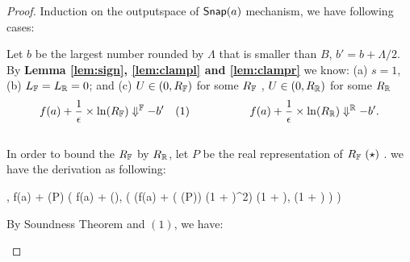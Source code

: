 \documentclass[a4paper,11pt]{article}
\begin{document}
\begin{proof}
%
Induction on the outputspace of $\mathsf{Snap}(a)$ mechanism, we have following cases:
	\begin{itemize}
		Let $b$ be the largest number rounded by $\Lambda$ that is smaller than $B$, $b' = b + \Lambda / 2$.
		\\
		By \textbf{Lemma \ref{lem:sign}, \ref{lem:clampl} and \ref{lem:clampr}} we know:
		(a) $s = 1$, 
		(b) $L_{\mathbb{F}} = L_{\mathbb{R}} = 0$;
		and (c) $U \in (0, R_{\mathbb{F}})$ for some $R_{\mathbb{F}}$
		, $U \in (0, R_{\mathbb{R}})$ for some $R_{\mathbb{R}}$
		$$f(a) + \frac{1}{\epsilon} \times \ln(R_{\mathbb{F}}) \Downarrow^{\mathbb{F}} -b' ~~~ (1)
		~~~~~~~~~~~~~~~~
		f(a) + \frac{1}{\epsilon} \times \ln(R_{\mathbb{R}}) \Downarrow^{\mathbb{R}} -b'.
		$$
		\\
		In order to bound the $R_{\mathbb{F}}$ by $R_{\mathbb{R}}$, let $P$ be the real representation of $\fvalR~(\star)$ . we have the derivation as following:
\\
{\scriptsize
\begin{mathpar}
				{
				\trsenv,
				f(a) +  \times \ln(P)
				\trsto
				\bigg(
				f(a) +  \times \ln(\fvalR),
				\big( (f(a) + 
				( \times \ln(P))
				(1 + \eta)^2)
				{(1 + \eta)},
				{(1 + \eta)}
				 \big)
				\bigg)
				}
		\end{mathpar}	
}		%
		By Soundness Theorem and $(1)$, we have:
		\[
\]
\end{itemize}
\end{proof}
\end{document}
